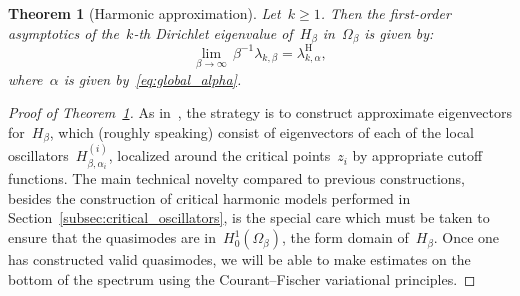 \documentclass[10pt]{article}
\newcommand{\1}{\mathbbm 1}
\newtheorem{theorem}{Theorem}
\begin{document}
    \begin{theorem}[Harmonic approximation]
        \label{thm:harm_approx}
        Let~$k\geq 1$. Then the first-order asymptotics of the~$k$-th Dirichlet eigenvalue of~$H_\beta$ in~$\Omega_\beta$ is given by:
        \begin{equation}
            \label{eq:harm_limit}
            \underset{\beta\to\infty}{\lim}\,\beta^{-1}\lambda_{k,\beta} = \lambda_{k,\alpha}^{\mathrm{H}},
        \end{equation}
        where~$\alpha$ is given by~\eqref{eq:global_alpha}.
    \end{theorem}

    \begin{proof}[Proof of Theorem~\ref{thm:harm_approx}]
        As in~\cite{S83}, the strategy is to construct approximate eigenvectors for~$H_\beta$, which (roughly speaking) consist of eigenvectors of each of the local oscillators~$H_{\beta,\alpha_i}^{(i)}$, localized around the critical points~$z_i$ by appropriate cutoff functions.
        The main technical novelty compared to previous constructions, besides the construction of critical harmonic models performed in Section~\ref{subsec:critical_oscillators}, is the special care which must be taken to ensure that the quasimodes are in~$H_0^1(\Omega_\beta)$, the form domain of~$H_\beta$. Once one has constructed valid quasimodes, we will be able to make estimates on the bottom of the spectrum using the Courant--Fischer variational principles.


\end{proof}
\end{document}
